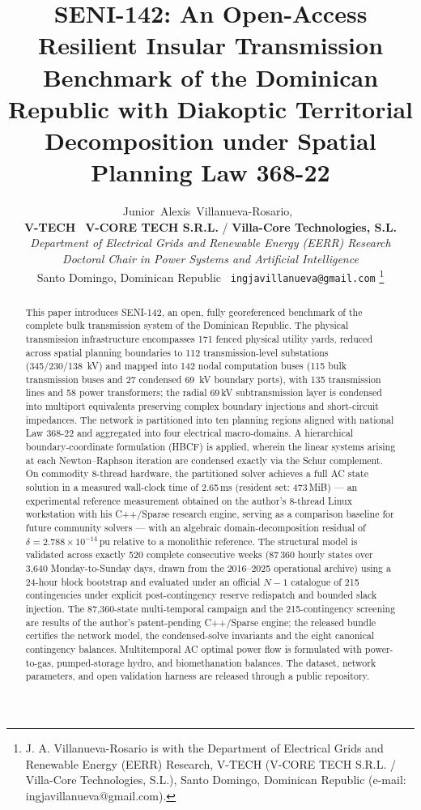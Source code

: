 \documentclass[10pt, journal]{IEEEtran}
\title{SENI-142: An Open-Access Resilient Insular Transmission Benchmark of the Dominican Republic with Diakoptic Territorial Decomposition under Spatial Planning Law 368-22}
\author{Junior~Alexis~Villanueva-Rosario,~\IEEEmembership{Ms.C., Ph.D.(c)}\\[0.3em]
{\normalsize\textnormal{\textbf{V-TECH} \textbar\ \textbf{V-CORE TECH S.R.L.} / \textbf{Villa-Core Technologies, S.L.}}}\\[0.15em]
{\footnotesize\textnormal{\textit{Department of Electrical Grids and Renewable Energy (EERR) Research}}}\\[0.15em]
{\footnotesize\textnormal{\textit{Doctoral Chair in Power Systems and Artificial Intelligence}}}\\[0.15em]
{\footnotesize\textnormal{Santo Domingo, Dominican Republic \textbar\ \texttt{ingjavillanueva@gmail.com}}}%
\thanks{J. A. Villanueva-Rosario is with the Department of Electrical Grids and Renewable Energy (EERR) Research, V-TECH (V-CORE TECH S.R.L. / Villa-Core Technologies, S.L.), Santo Domingo, Dominican Republic (e-mail: ingjavillanueva@gmail.com).}}
\begin{document}
\maketitle

\begin{abstract}
This paper introduces SENI-142, an open, fully georeferenced benchmark of the complete bulk transmission system of the Dominican Republic. The physical transmission infrastructure encompasses 171 fenced physical utility yards, reduced across spatial planning boundaries to 112 transmission-level substations (345/230/138~kV) and mapped into 142 nodal computation buses (115 bulk transmission buses and 27 condensed 69~kV boundary ports), with 135 transmission lines and 58 power transformers; the radial 69\,kV subtransmission layer is condensed into multiport equivalents preserving complex boundary injections and short-circuit impedances. The network is partitioned into ten planning regions aligned with national Law 368-22 and aggregated into four electrical macro-domains. A hierarchical boundary-coordinate formulation (HBCF) is applied, wherein the linear systems arising at each Newton--Raphson iteration are condensed exactly via the Schur complement. On commodity 8-thread hardware, the partitioned solver achieves a full AC state solution in a measured wall-clock time of 2.65\,ms (resident set: 473\,MiB) --- an experimental reference measurement obtained on the author's 8-thread Linux workstation with his C++/Sparse research engine, serving as a comparison baseline for future community solvers --- with an algebraic domain-decomposition residual of $\delta = 2.788 \times 10^{-14}$\,pu relative to a monolithic reference. The structural model is validated across exactly 520 complete consecutive weeks (87\,360 hourly states over 3,640 Monday-to-Sunday days, drawn from the 2016--2025 operational archive) using a 24-hour block bootstrap and evaluated under an official $N-1$ catalogue of 215 contingencies under explicit post-contingency reserve redispatch and bounded slack injection. The 87,360-state multi-temporal campaign and the 215-contingency screening are results of the author's patent-pending C++/Sparse engine; the released bundle certifies the network model, the condensed-solve invariants and the eight canonical contingency balances. Multitemporal AC optimal power flow is formulated with power-to-gas, pumped-storage hydro, and biomethanation balances. The dataset, network parameters, and open validation harness are released through a public repository.
\end{abstract}
\end{document}
